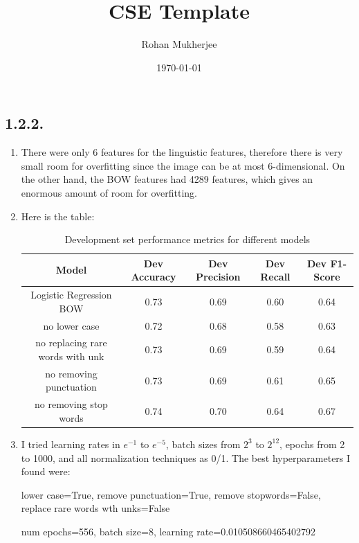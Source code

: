 \documentclass[12pt]{article}
\title{CSE Template}
\date{\today}
\author{Rohan Mukherjee}
\theoremstyle{definitionstyle}
\begin{document}
    \maketitle
    \subsection*{1.2.2.}
    \begin{enumerate}[leftmargin=\labelsep]
        \item There were only 6 features for the linguistic features, therefore there is very small room for overfitting since the image can be at most 6-dimensional. On the other hand, the BOW features had 4289 features, which gives an enormous amount of room for overfitting. 
        \item Here is the table:
        \begin{table}[H]
            \centering
            \begin{tabular}{|c|c|c|c|c|}
                \hline
                Model & Dev Accuracy & Dev Precision & Dev Recall & Dev F1-Score \\
                \hline
                Logistic Regression BOW & 0.73 & 0.69 & 0.60 & 0.64 \\
                no lower case & 0.72 & 0.68 & 0.58 & 0.63 \\
                no replacing rare words with unk & 0.73 & 0.69 & 0.59 & 0.64 \\
                no removing punctuation & 0.73 & 0.69 & 0.61 & 0.65 \\
                no removing stop words & 0.74 & 0.70 & 0.64 & 0.67 \\
                \hline
            \end{tabular}
            \caption{Development set performance metrics for different models}
            \label{tab:dev_metrics}
        \end{table}
        \item I tried learning rates in $e^{-1}$ to $e^{-5}$, batch sizes from $2^3$ to $2^{12}$, epochs from 2 to 1000, and all normalization techniques as 0/1. The best hyperparameters I found were:

        lower case=True, remove punctuation=True, remove stopwords=False, replace rare words wth unks=False

        num epochs=556, batch size=8, learning rate=0.010508660465402792


\end{enumerate}
\end{document}
